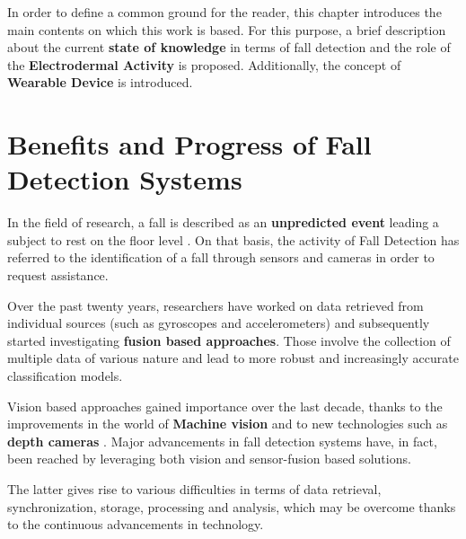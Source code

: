 \label{ch:background}

In order to define a common ground for the reader, this chapter introduces the main contents on which this work is based. For this purpose, a brief description about the current \textbf{state of knowledge} in terms of fall detection and the role of the \textbf{Electrodermal Activity} is proposed. Additionally, the concept of \textbf{Wearable Device} is introduced.

\section{Benefits and Progress of Fall Detection Systems }\label{sec:fallintro}

In the field of research, a fall is described as an \textbf{unpredicted event} leading a subject to rest on the floor level \cite{Lamb1}. On that basis, the activity of Fall Detection has referred to the identification of a fall through sensors and cameras in order to request assistance.

Over the past twenty years, researchers have worked on data retrieved from individual sources (such as gyroscopes and accelerometers) and subsequently started investigating \textbf{fusion based approaches}. Those involve the collection of multiple data of various nature and lead to more robust and increasingly accurate classification models. 

Vision based approaches gained importance over the last decade, thanks to the improvements in the world of \textbf{Machine vision} and to new technologies such as \textbf{depth cameras} \cite{elderlySurvey}. Major advancements in fall detection systems have, in fact, been reached by leveraging both vision and sensor-fusion based solutions. 

The latter gives rise to various difficulties in terms of data retrieval, synchronization, storage, processing and analysis, which may be overcome thanks to the continuous advancements in technology.


